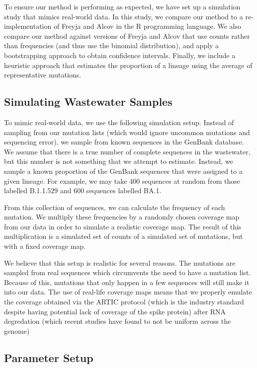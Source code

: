 \documentclass{article}
\begin{document}
To ensure our method is performing as expected, we have set up a simulation study that mimics real-world data.
In this study, we compare our method to a re-implementation of Freyja and Alcov in the R programming language.
We also compare our method against versions of Freyja and Alcov that use counts rather than frequencies (and thus use the binomial distribution), and apply a bootstrapping approach to obtain confidence intervals.
Finally, we include a heuristic approach that estimates the proportion of a lineage using the average of representative mutations.

\subsection{Simulating Wastewater Samples}

To mimic real-world data, we use the following simulation setup.
Instead of sampling from our mutation lists (which would ignore uncommon mutations and sequencing error), we sample from known sequences in the GenBank database.
We assume that there is a true number of complete sequences in the wastewater, but this number is not something that we attempt to estimate.
Instead, we sample a known proportion of the GenBank sequences that were assigned to a given lineage.
For example, we may take 400 sequences at random from those labelled B.1.1.529 and 600 sequences labelled BA.1.

From this collection of sequences, we can calculate the frequency of each mutation.
We multiply these frequencies by a randomly chosen coverage map from our data in order to simulate a realistic coverage map.
The result of this multiplication is a simulated set of counts of a simulated set of mutations, but with a fixed coverage map.

We believe that this setup is realistic for several reasons.
The mutations are sampled from real sequences which circumvents the need to have a mutation list.
Because of this, mutations that only happen in a few sequences will still make it into our data.
The use of real-life coverage maps means that we properly emulate the coverage obtained via the ARTIC protocol (which is the industry standard despite having potential lack of coverage of the spike protein) after RNA degredation (which recent studies have found to not be uniform across the genome) 

\subsection{Parameter Setup}
\end{document}

